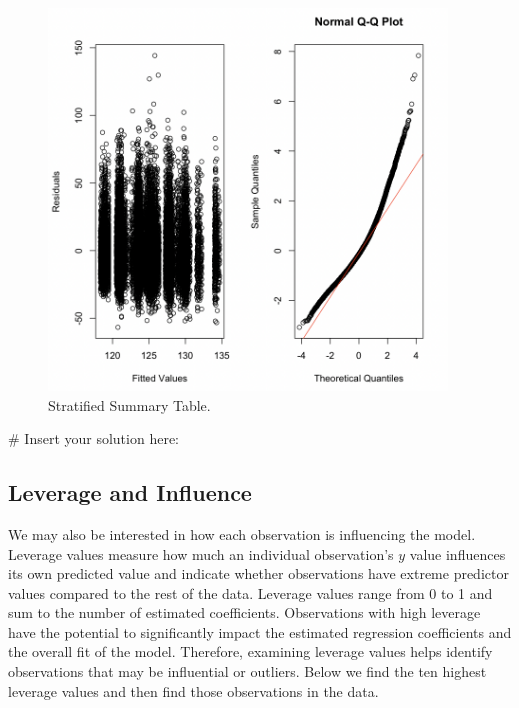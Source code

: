 \documentclass[
  letterpaper,
]{krantz}
\makeatletter
\newenvironment{Shaded}{\begin{snugshade}}{\end{snugshade}}
\newcommand{\CommentTok}[1]{\textcolor[rgb]{0.37,0.37,0.37}{#1}}
\newenvironment{kframe}{%
\medskip{}
\setlength{\fboxsep}{.8em}
 \def\at@end@of@kframe{}%
 \ifinner\ifhmode%
  \def\at@end@of@kframe{\end{minipage}}%
  \begin{minipage}{\columnwidth}%
 \fi\fi%
 \def\FrameCommand##1{\hskip\@totalleftmargin \hskip-\fboxsep
 \colorbox{shadecolor}{##1}\hskip-\fboxsep
     \hskip-\linewidth \hskip-\@totalleftmargin \hskip\columnwidth}%
 \MakeFramed {\advance\hsize-\width
   \@totalleftmargin\z@ \linewidth\hsize
   \@setminipage}}%
 {\par\unskip\endMakeFramed%
 \at@end@of@kframe}
\renewenvironment{Shaded}{\begin{kframe}}{\end{kframe}}
\makeatother
\begin{document}
\begin{figure}

{\centering \includegraphics[width=4.16667in,height=\textheight]{book/images/10-practicequestion2answer.png}

}

\caption{\label{fig-pq2}Stratified Summary Table.}

\end{figure}

\begin{Shaded}
\begin{Highlighting}[]
\CommentTok{\# Insert your solution here: }
\end{Highlighting}
\end{Shaded}

\hypertarget{leverage-and-influence}{%
\subsection{Leverage and Influence}\label{leverage-and-influence}}

We may also be interested in how each observation is influencing the
model. Leverage values measure how much an individual observation's
\(y\) value influences its own predicted value and indicate whether
observations have extreme predictor values compared to the rest of the
data. Leverage values range from 0 to 1 and sum to the number of
estimated coefficients. Observations with high leverage have the
potential to significantly impact the estimated regression coefficients
and the overall fit of the model. Therefore, examining leverage values
helps identify observations that may be influential or outliers. Below
we find the ten highest leverage values and then find those observations
in the data.
\end{document}
